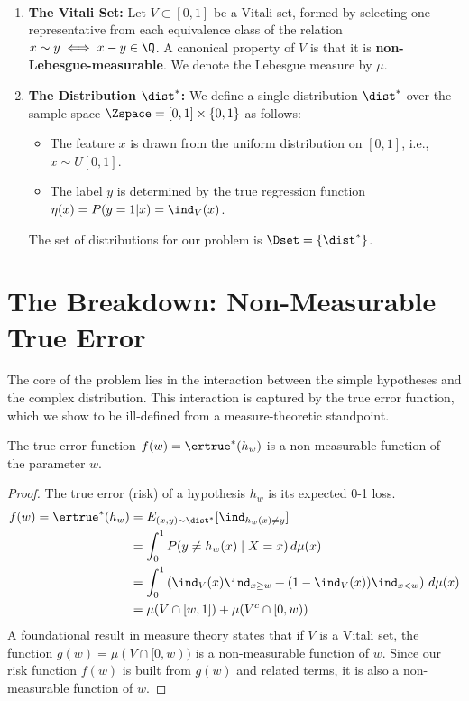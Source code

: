 \begin{construction}
    \
    \begin{enumerate}
        \item \textbf{The Vitali Set:} Let $V \subset [0, 1]$ be a Vitali set, formed by selecting one representative from each equivalence class of the relation $x \sim y \iff x-y \in \Q$. A canonical property of $V$ is that it is \textbf{non-Lebesgue-measurable}. We denote the Lebesgue measure by $\mu$.

        \item \textbf{The Distribution $\dist^*$:} We define a single distribution $\dist^*$ over the sample space $\Zspace = [0, 1] \times \{0, 1\}$ as follows:
        \begin{itemize}
            \item The feature $x$ is drawn from the uniform distribution on $[0, 1]$, i.e., $x \sim U[0, 1]$.
            \item The label $y$ is determined by the true regression function $\eta(x) = P(y=1|x) = \ind_V(x)$.
        \end{itemize}
        The set of distributions for our problem is $\Dset = \{\dist^*\}$.
    \end{enumerate}
\end{construction}

\section{The Breakdown: Non-Measurable True Error}

The core of the problem lies in the interaction between the simple hypotheses and the complex distribution. This interaction is captured by the true error function, which we show to be ill-defined from a measure-theoretic standpoint.

\begin{theorem}
    The true error function $f(w) = \ertrue^*(h_w)$ is a non-measurable function of the parameter $w$.
\end{theorem}
\begin{proof}
    The true error (risk) of a hypothesis $h_w$ is its expected 0-1 loss.
    \begin{align*}
        f(w) = \ertrue^*(h_w) &= E_{(x,y)\sim\dist^*}[\ind_{h_w(x) \neq y}] \\
        &= \int_0^1 P(y \neq h_w(x) \mid X=x) \, d\mu(x) \\
        &= \int_0^1 \left( \ind_V(x)\ind_{x \ge w} + (1-\ind_V(x))\ind_{x < w} \right) \, d\mu(x) \\
        &= \mu(V \cap [w, 1]) + \mu(V^c \cap [0, w))
    \end{align*}
    A foundational result in measure theory states that if $V$ is a Vitali set, the function $g(w) = \mu(V \cap [0, w))$ is a non-measurable function of $w$. Since our risk function $f(w)$ is built from $g(w)$ and related terms, it is also a non-measurable function of $w$.
\end{proof}

